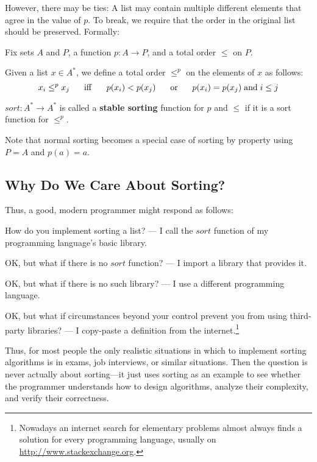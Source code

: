 However, there may be ties: A list may contain multiple different elements that agree in the value of $p$.
To break, we require that the order in the original list should be preserved.
Formally:

\begin{definition}\label{def:ad:sort:stable}
Fix sets $A$ and $P$, a function $p:A\to P$, and a total order $\leq$ on $P$.

Given a list $x\in A^*$, we define a total order $\leq^p$ on the elements of $x$ as follows:
 \[x_i \leq^p x_j \hspace*{.5cm}\;\mathrm{iff}\;\hspace*{.5cm} p(x_i) < p(x_j) \hspace*{.5cm} \;\mathrm{or}\; \hspace*{.5cm} p(x_i)=p(x_j) \;\mathrm{and}\; i\leq j\]

$sort:A^*\to A^*$ is called a \textbf{stable sorting} function for $p$ and $\leq$ if it is a sort function for $\leq^p$.
\end{definition}

Note that normal sorting becomes a special case of sorting by property using $P=A$ and $p(a)=a$.

\subsection{Why Do We Care About Sorting?}

Thus, a good, modern programmer might respond as follows:
\begin{compactenum}
\item How do you implement sorting a list? --- I call the $\mathit{sort}$ function of my programming language's basic library.
\item OK, but what if there is no $\mathit{sort}$ function? --- I import a library that provides it.
\item OK, but what if there is no such library? --- I use a different programming language.
\item OK, but what if circumstances beyond your control prevent you from using third-party libraries? --- I copy-paste a definition from the internet.\footnote{Nowadays an internet search for elementary problems almost always finds a solution for every programming language, usually on \url{http://www.stackexchange.org}.}
\end{compactenum}

Thus, for most people the only realistic situations in which to implement sorting algorithms is in exams, job interviews, or similar situations.
Then the question is never actually about sorting---it just uses sorting as an example to see whether the programmer understands how to design algorithms, analyze their complexity, and verify their correctness.

